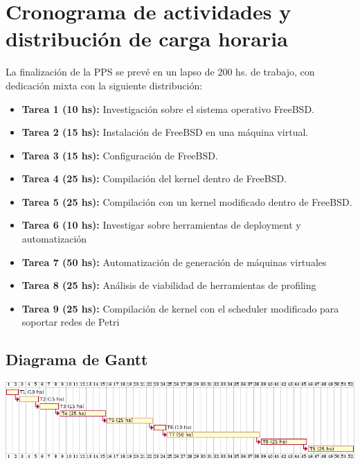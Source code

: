 \documentclass[a4paper, 11pt]{article}
\begin{document}
\section*{Cronograma de actividades y distribución de carga horaria}
	
	La finalización de la PPS se prevé en un lapso de 200 hs. de trabajo, con dedicación mixta con la siguiente distribución:
	
	\begin{itemize}
		\item \textbf{Tarea 1 (10 hs):} Investigación sobre el sistema operativo FreeBSD.
		\item \textbf{Tarea 2 (15 hs):} Instalación de FreeBSD en una máquina virtual.
		\item \textbf{Tarea 3 (15 hs):} Configuración de FreeBSD.
		\item \textbf{Tarea 4 (25 hs):} Compilación del kernel dentro de FreeBSD.
		\item \textbf{Tarea 5 (25 hs):} Compilación con un kernel modificado dentro de FreeBSD.
		\item \textbf{Tarea 6 (10 hs):} Investigar sobre herramientas de deployment y automatización
		\item \textbf{Tarea 7 (50 hs):} Automatización de generación de máquinas virtuales
		\item \textbf{Tarea 8 (25 hs):} Análisis de viabilidad de herramientas de profiling 
		\item \textbf{Tarea 9 (25 hs):} Compilación de kernel con el scheduler modificado para soportar redes de Petri
	\end{itemize}

\subsection*{Diagrama de Gantt}
	\vspace{1cm}

	\includegraphics[width=16cm]{recursos/gantt_diagram}
\end{document}
